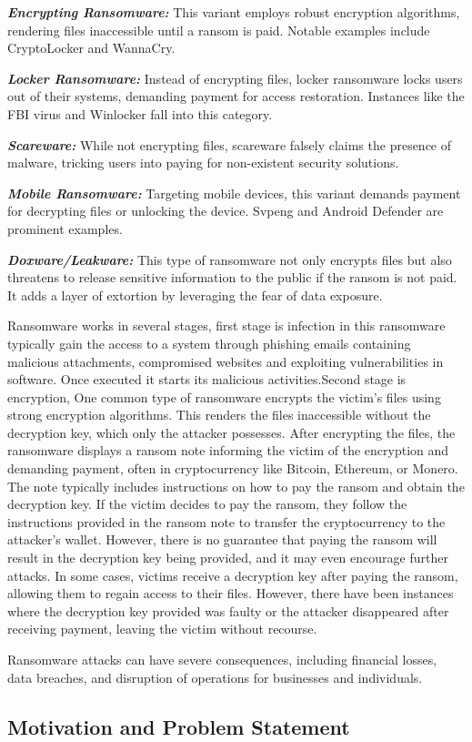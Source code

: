 \documentclass[12pt,letterpaper]{article}
\begin{document}
    \textbf{\textit{Encrypting Ransomware:}} This variant employs robust encryption algorithms, rendering files inaccessible until a ransom is paid. Notable examples include CryptoLocker and WannaCry.

    \textbf{\textit{Locker Ransomware:}} Instead of encrypting files, locker ransomware locks users out of their systems, demanding payment for access restoration. Instances like the FBI virus and Winlocker fall into this category.

    \textbf{\textit{Scareware:}} While not encrypting files, scareware falsely claims the presence of malware, tricking users into paying for non-existent security solutions.

    \textbf{\textit{Mobile Ransomware:}} Targeting mobile devices, this variant demands payment for decrypting files or unlocking the device. Svpeng and Android Defender are prominent examples.
    
    \textbf{\textit{Doxware/Leakware:}} This type of ransomware not only encrypts files but also threatens to release sensitive information to the public if the ransom is not paid. It adds a layer of extortion by leveraging the fear of data exposure.
    
    Ransomware works in several stages, first stage is infection in this ransomware typically gain the access to a system through phishing emails containing malicious attachments, compromised websites and exploiting vulnerabilities in software. Once executed it starts its malicious activities.Second stage is encryption, One common type of ransomware encrypts the victim's files using strong encryption algorithms. This renders the files inaccessible without the decryption key, which only the attacker possesses. After encrypting the files, the ransomware displays a ransom note informing the victim of the encryption and demanding payment, often in cryptocurrency like Bitcoin, Ethereum, or Monero. The note typically includes instructions on how to pay the ransom and obtain the decryption key. If the victim decides to pay the ransom, they follow the instructions provided in the ransom note to transfer the cryptocurrency to the attacker's wallet. However, there is no guarantee that paying the ransom will result in the decryption key being provided, and it may even encourage further attacks. In some cases, victims receive a decryption key after paying the ransom, allowing them to regain access to their files. However, there have been instances where the decryption key provided was faulty or the attacker disappeared after receiving payment, leaving the victim without recourse.
    
    Ransomware attacks can have severe consequences, including financial losses, data breaches, and disruption of operations for businesses and individuals.

    \subsection{Motivation and Problem Statement}

\cite{AKBANOV2019111}
\newpage
{}
    \printbibliography
\end{document}
